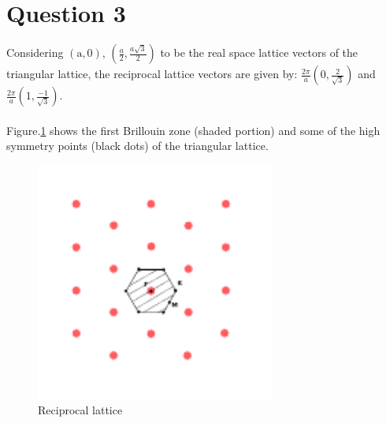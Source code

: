 \documentclass[a4paper]{article}
\begin{document}
\section*{Question 3}
Considering $(\mathrm{a},0)$, $(\frac{a}{2},\frac{a\sqrt{3}}{2})$ to be the real space lattice vectors of the triangular lattice, the reciprocal lattice vectors are given by: $\frac{2\pi}{a}(0,\frac{2}{\sqrt{3}})$ and $\frac{2\pi}{a}(1,\frac{-1}{\sqrt{3}})$.\\
\\
Figure.\ref{fig:1} shows the first Brillouin zone (shaded portion) and some of the high symmetry points (black dots) of the triangular lattice.
\begin{figure}[htpb]
    \centering
    \includegraphics[width=0.7\textwidth]{triangular.pdf}
    \caption{Reciprocal lattice}
    \label{fig:1}
\end{figure}
\end{document}
